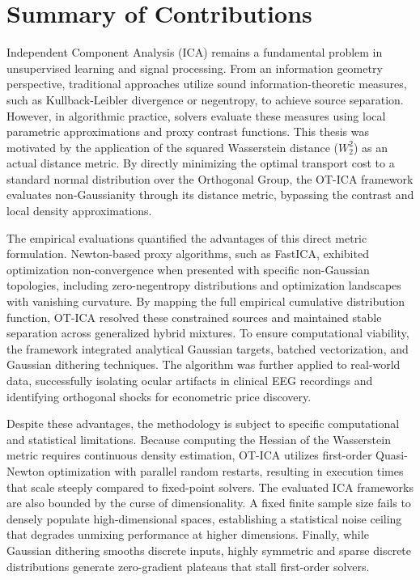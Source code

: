 \documentclass[12pt,a4paper,twoside,openany]{book}
\begin{document}
\section{Summary of Contributions}
Independent Component Analysis (ICA) remains a fundamental problem in unsupervised learning and signal processing. 
From an information geometry perspective, traditional approaches utilize sound information-theoretic measures, 
such as Kullback-Leibler divergence or negentropy, to achieve source separation. However, in algorithmic practice, 
solvers evaluate these measures using local parametric approximations and proxy contrast functions. 
This thesis was motivated by the application of the squared Wasserstein distance ($W_2^2$) as an actual distance metric. 
By directly minimizing the optimal transport cost to a standard normal distribution over the Orthogonal Group, 
the OT-ICA framework evaluates non-Gaussianity through its distance metric, bypassing the contrast and local density approximations.

The empirical evaluations quantified the advantages of this direct metric formulation. Newton-based proxy algorithms, 
such as FastICA, exhibited optimization non-convergence when presented with specific non-Gaussian topologies, 
including zero-negentropy distributions and optimization landscapes with vanishing curvature. 
By mapping the full empirical cumulative distribution function, OT-ICA resolved these constrained sources 
and maintained stable separation across generalized hybrid mixtures. To ensure computational viability, 
the framework integrated analytical Gaussian targets, batched vectorization, and Gaussian dithering techniques. 
The algorithm was further applied to real-world data, successfully isolating ocular artifacts in clinical 
EEG recordings and identifying orthogonal shocks for econometric price discovery.

Despite these advantages, the methodology is subject to specific computational and statistical limitations. 
Because computing the Hessian of the Wasserstein metric requires continuous density estimation, 
OT-ICA utilizes first-order Quasi-Newton optimization with parallel random restarts, resulting in execution times 
that scale steeply compared to fixed-point solvers. The evaluated ICA frameworks are also bounded by the curse of dimensionality. 
A fixed finite sample size fails to densely populate high-dimensional spaces, establishing a statistical noise ceiling 
that degrades unmixing performance at higher dimensions. Finally, while Gaussian dithering smooths discrete inputs, 
highly symmetric and sparse discrete distributions generate zero-gradient plateaus that stall first-order solvers.
\end{document}
